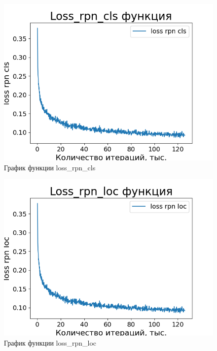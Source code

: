\begin{figure}[h!] 
	\center
	\includegraphics [scale=0.8] {my_folder/images/loss_rpn_cls_second}
	\caption{График функции loss\_rpn\_cls}
	\label{fig:loss_rpn_cls}
\end{figure}

\begin{figure}[h!] 
	\center
	\includegraphics [scale=0.8] {my_folder/images/loss_rpn_loc_second}
	\caption{График функции loss\_rpn\_loc}
	\label{fig:loss_rpn_loc}
\end{figure}


